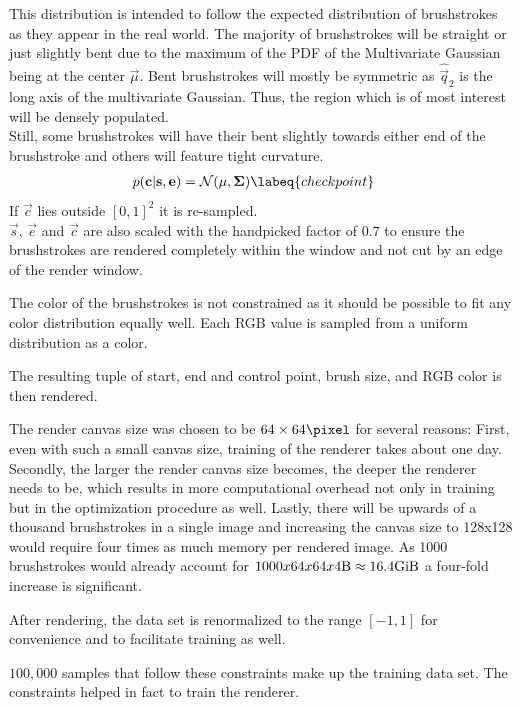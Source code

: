 This distribution is intended to follow the expected distribution of brushstrokes as they appear in the real world.
The majority of brushstrokes will be straight or just slightly bent due to the maximum of the PDF of the Multivariate Gaussian being at the center $\vec{\mu}$.
Bent brushstrokes will mostly be symmetric as $\hat{\vec{q}}_2$ is the long axis of the multivariate Gaussian.
Thus, the region which is of most interest will be densely populated.\\
Still, some brushstrokes will have their bent slightly towards either end of the brushstroke and others will feature tight curvature.
\begin{align}
    p(\vec{c}| \vec{s}, \vec{e}) & = \mathcal{N}(\vec{\mu}, \mat{\Sigma}) \labeq{checkpoint}
\end{align}
If $\vec{c}$ lies outside $[0, 1]^2$ it is re-sampled.\\
$\vec{s}$, $\vec{e}$ and $\vec{c}$ are also scaled with the handpicked factor of $0.7$ to ensure the brushstrokes are rendered completely within the window and not cut by an edge of the render window.

The color of the brushstrokes is not constrained as it should be possible to fit any color distribution equally well.
Each RGB value is sampled from a uniform distribution as a color.

The resulting tuple of start, end and control point, brush size, and RGB color is then rendered.

The render canvas size was chosen to be $64\times64 \si{\pixel}$ for several reasons:
First, even with such a small canvas size, training of the renderer takes about one day.
Secondly, the larger the render canvas size becomes, the deeper the renderer needs to be, which results in more computational overhead not only in training but in the optimization procedure as well.
Lastly, there will be upwards of a thousand brushstrokes in a single image and increasing the canvas size to 128x128 would require four times as much memory per rendered image.
As 1000 brushstrokes would already account for $1000 x 64 x 64 x 4 \si{\byte} \approx 16.4 \si{\gibi \byte}$ a four-fold increase is significant.

After rendering, the data set is renormalized to the range $[-1, 1]$ for convenience and to facilitate training as well.

$100,000$ samples that follow these constraints make up the training data set.
The constraints helped in fact to train the renderer.

